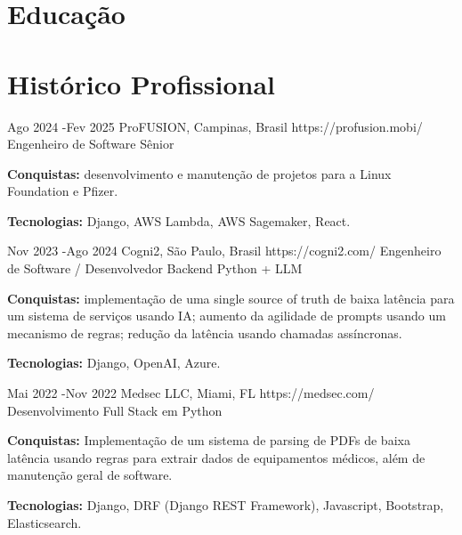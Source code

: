 \documentclass[10pt]{article} %
\begin{document}

\section{Educação}



\section{Histórico Profissional}

\job
{Ago 2024 -}{Fev 2025}
{ProFUSION, Campinas, Brasil}
{https://profusion.mobi/}
{Engenheiro de Software Sênior}
{\rule{0mm}{2mm}\textbf{Conquistas:} desenvolvimento e manutenção de projetos para a Linux Foundation e Pfizer.\\
\rule{0mm}{3mm}\textbf{Tecnologias:} Django, AWS Lambda, AWS Sagemaker, React.}


\job
{Nov 2023 -}{Ago 2024}
{Cogni2, São Paulo, Brasil}
{https://cogni2.com/}
{Engenheiro de Software / Desenvolvedor Backend Python + LLM}
{\rule{0mm}{2mm}\textbf{Conquistas:} implementação de uma single source of truth  de baixa latência para um sistema de serviços usando IA; aumento da agilidade de prompts usando um mecanismo de regras; redução da latência usando chamadas assíncronas.\\
\rule{0mm}{3mm}\textbf{Tecnologias:} Django, OpenAI, Azure.}


\job
{Mai 2022 -}{Nov 2022}
{Medsec LLC, Miami, FL}
{https://medsec.com/}
{Desenvolvimento Full Stack em Python}
{\rule{0mm}{2mm}\textbf{Conquistas:} Implementação de um sistema de parsing de PDFs de baixa latência usando regras para extrair dados de equipamentos médicos, além de manutenção geral de software.\\
\rule{0mm}{3mm}\textbf{Tecnologias:} Django, DRF (Django REST Framework), Javascript, Bootstrap, Elasticsearch.}
\end{document}

